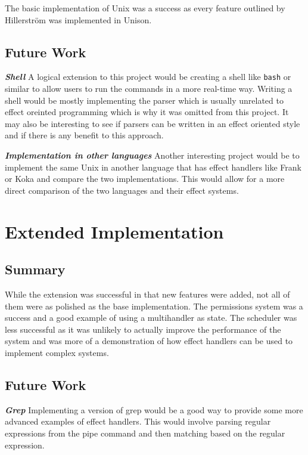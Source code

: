 \documentclass[logo,bsc,singlespacing,parskip]{infthesis}
\begin{document}
The basic implementation of Unix was a success as every feature outlined by 
Hillerstr\"{o}m was implemented in Unison. 

\subsection{Future Work}

\emph{\textbf{Shell}} A logical extension to this project would be creating a shell like \texttt{bash}
or similar to allow users to run the commands in a more real-time way. Writing a
shell would be mostly implementing the parser which is usually unrelated to
effect oreinted programming which is why it was omitted from this project.  It
may also be interesting to see if parsers can be written in an effect oriented
style and if there is any benefit to this approach.

\emph{\textbf{Implementation in other languages}} Another interesting project
would be to implement the same Unix in another language that has effect handlers like
Frank or Koka and compare the two implementations. This would allow for a more
direct comparison of the two languages and their effect systems.

\section{Extended Implementation}

\subsection{Summary}

While the extension was successful in that new features were added, not all of them 
were as polished as the base implementation. The permissions system was a success
and a good example of using a multihandler as state. The scheduler was less successful
as it was unlikely to actually improve the performance of the system and was more
of a demonstration of how effect handlers can be used to implement complex systems.

\subsection{Future Work}

\emph{\textbf{Grep}} Implementing a version of grep would be a good way to
provide some more advanced examples of effect handlers. This would involve
parsing regular expressions from the pipe command and then matching based on 
the regular expression.
\end{document}
